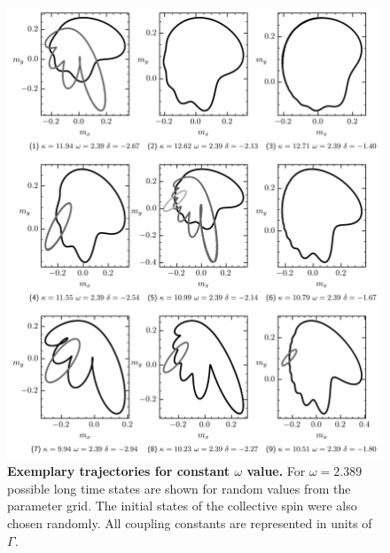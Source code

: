     \begin{figure}[H]
        \centering
        \includegraphics{pictures/lc_traj_wcut3.png}
        \caption{\textbf{Exemplary trajectories for constant $\omega$ value.} For $\omega=2.389$ possible long time states are shown for random values from the parameter grid. The initial states of the collective spin were also chosen randomly. All coupling constants are represented in units of $\Gamma$.}
    \end{figure}
    
